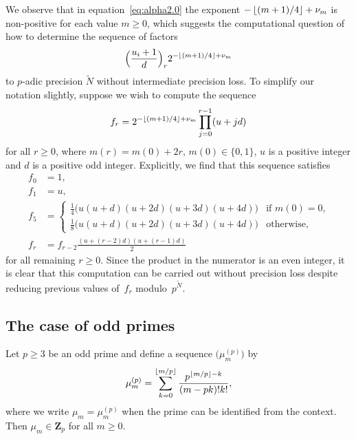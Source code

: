 \begin{rem}
We observe that in equation~\eqref{eq:alpha2.0} the exponent 
$-\left\lfloor(m+1)/4\right\rfloor+\nu_m$ is non-positive for each value $m \geq 0$, 
which suggests the computational question of how to determine the 
sequence of factors 
\begin{equation*}
\Bigl(\frac{u_i+1}{d}\Bigr)_r 2^{- \left\lfloor(m+1)/4\right\rfloor + \nu_m}
\end{equation*}
to $p$-adic precision $\tilde{N}$ without intermediate precision loss.
To simplify our notation slightly, suppose we wish to compute the sequence
\begin{equation*}
f_r = 2^{- \left\lfloor(m+1)/4\right\rfloor + \nu_m} \prod_{j=0}^{r-1} (u + j d)
\end{equation*}
for all $r \geq 0$, where $m(r) = m(0) + 2r$, $m(0) \in \{0,1\}$, 
$u$ is a positive integer and $d$ is a positive odd integer.
Explicitly, we find that this sequence satisfies 
\begin{align*}
f_0 & = 1, \\
f_1 & = u, \\
f_5 & = \begin{cases}
        \displaystyle \tfrac{1}{4} \bigl( u (u + d) (u + 2d) (u + 3d) (u + 4d) \bigr)
            & \text{if $m(0)=0$,} \\
        \displaystyle \tfrac{1}{8} \bigl( u (u + d) (u + 2d) (u + 3d) (u + 4d) \bigr)
            & \text{otherwise,}
        \end{cases} \\
f_r & = f_{r-2} \frac{(u + (r - 2)d)(u + (r - 1)d)}{2}
\end{align*}
for all remaining $r \geq 0$.  Since the product in the numerator is 
an even integer, it is clear that this computation can be carried 
out without precision loss despite reducing previous values of~$f_r$ 
modulo~$p^{\tilde{N}}$.
\end{rem}


\subsection{The case of odd primes}

\begin{lem} \label{lem:mup}
Let $p \geq 3$ be an odd prime and define a sequence 
$\bigl(\mu_m^{(p)}\bigr)$ by 
\begin{equation*}
\mu_m^{(p)} = \sum_{k=0}^{\left\lfloor m/p\right\rfloor} \frac{p^{\left\lfloor m/p\right\rfloor - k}}{(m-pk)! k!}, 
\end{equation*}
where we write $\mu_m = \mu_m^{(p)}$ when the prime can be identified 
from the context.  Then $\mu_m \in \mathbf{Z}_p$ for all $m \geq 0$.
\end{lem}

